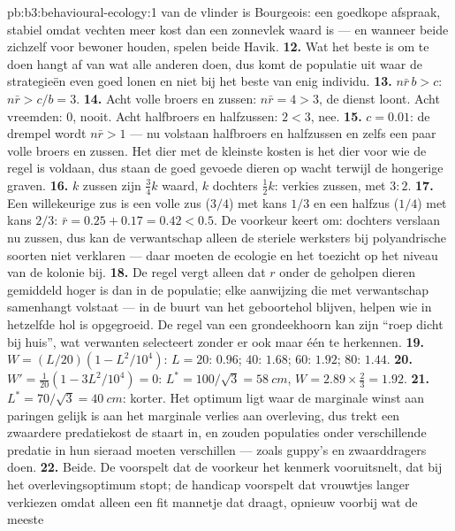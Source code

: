 \begin{solution}{pb:b3:behavioural-ecology:1}
van de vlinder is Bourgeois: een goedkope afspraak, stabiel omdat
vechten meer kost dan een zonnevlek waard is --- en wanneer beide
zichzelf voor bewoner houden, spelen beide Havik.
\textbf{12.} Wat het beste is om te doen hangt af van wat alle anderen
doen, dus komt de populatie uit waar de strategieën even goed lonen en
niet bij het beste van enig individu.
\textbf{13.} $n\bar r\,b > c$: $n\bar r > c/b = 3$.
\textbf{14.} Acht volle broers en zussen: $n\bar r = 4 > 3$, de dienst
loont. Acht vreemden: $0$, nooit. Acht halfbroers en halfzussen: $2 < 3$,
nee.
\textbf{15.} $c = 0.01$: de drempel wordt $n\bar r > 1$ --- nu volstaan
halfbroers en halfzussen en zelfs een paar volle broers en zussen. Het
dier met de kleinste kosten is het dier voor wie de regel is voldaan,
dus staan de goed gevoede dieren op wacht terwijl de hongerige graven.
\textbf{16.} $k$ zussen zijn $\tfrac{3}{4}k$ waard, $k$ dochters
$\tfrac{1}{2}k$: verkies zussen, met $3{:}2$.
\textbf{17.} Een willekeurige zus is een volle zus ($3/4$) met kans
$1/3$ en een halfzus ($1/4$) met kans $2/3$: $\bar r = 0.25 +
0.17 = 0.42 < 0.5$. De voorkeur keert om: dochters verslaan nu zussen,
dus kan de verwantschap alleen de steriele werksters bij polyandrische
soorten niet verklaren --- daar moeten de ecologie en het toezicht op
het niveau van de kolonie bij.
\textbf{18.} De regel vergt alleen dat $r$ onder de geholpen dieren
gemiddeld hoger is dan in de populatie; elke aanwijzing die met
verwantschap samenhangt volstaat --- in de buurt van het geboortehol
blijven, helpen wie in hetzelfde hol is opgegroeid. De regel van een
grondeekhoorn kan zijn ``roep dicht bij huis'', wat
verwanten selecteert zonder er ook maar één te herkennen.
\textbf{19.} $W = (L/20)(1 - L^{2}/10^{4})$: $L = 20$: $0.96$; $40$:
$1.68$; $60$: $1.92$; $80$: $1.44$.
\textbf{20.} $W' = \tfrac{1}{20}(1 - 3L^{2}/10^{4}) = 0$: $L^{*} = 100/\sqrt{3}
= \qty{58}{cm}$, $W = 2.89\times\tfrac{2}{3} = 1.92$.
\textbf{21.} $L^{*} = 70/\sqrt{3} = \qty{40}{cm}$: korter. Het optimum
ligt waar de marginale winst aan paringen gelijk is aan het marginale
verlies aan overleving, dus trekt een zwaardere predatiekost de staart
in, en zouden populaties onder verschillende predatie in hun sieraad
moeten verschillen --- zoals guppy's en zwaarddragers doen.
\textbf{22.} Beide. De  voorspelt dat de
voorkeur het kenmerk vooruitsnelt, dat bij het overlevingsoptimum
stopt; de handicap voorspelt dat vrouwtjes langer verkiezen omdat
alleen een fit mannetje dat draagt, opnieuw voorbij wat de meeste

\end{solution}
